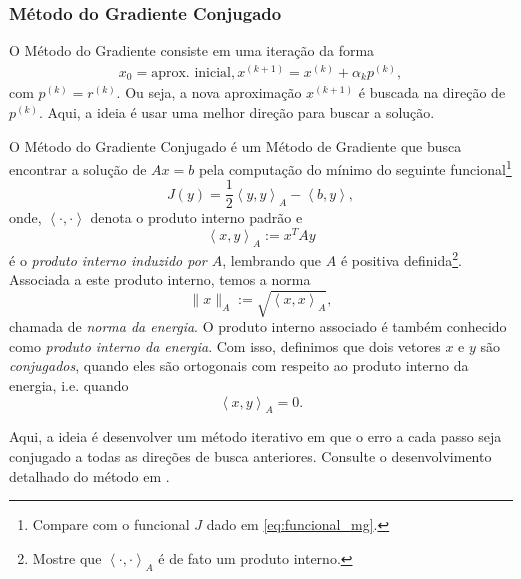\subsubsection{Método do Gradiente Conjugado}

O Método do Gradiente consiste em uma iteração da forma
\begin{gather}
  x_0 = \text{aprox. inicial},
  x^{(k+1)} = x^{(k)} + \alpha_kp^{(k)},
\end{gather}
com $p^{(k)} = r^{(k)}$. Ou seja, a nova aproximação $x^{(k+1)}$ é buscada na direção de $p^{(k)}$. Aqui, a ideia é usar uma melhor direção para buscar a solução.


O Método do Gradiente Conjugado é um Método de Gradiente que busca encontrar a solução de $Ax = b$ pela computação do mínimo do seguinte funcional\footnote{Compare com o funcional $J$ dado em \eqref{eq:funcional_mg}.}
\begin{equation}
  J(y) = \frac{1}{2}\left<y,y\right>_A - \left<b,y\right>, 
\end{equation}
onde, $\left<\cdot,\cdot\right>$ denota o produto interno padrão e
\begin{equation}
  \left<x,y\right>_A := x^TAy
\end{equation}
é o \emph{produto interno induzido por $A$}, lembrando que $A$ é positiva definida\footnote{Mostre que $\left<\cdot,\cdot\right>_A$ é de fato um produto interno.}. Associada a este produto interno, temos a norma
\begin{equation}
  \|x\|_A := \sqrt{\left<x,x\right>_A},
\end{equation}
chamada de \emph{norma da energia}. O produto interno associado é também conhecido como \emph{produto interno da energia}. Com isso, definimos que dois vetores $x$ e $y$ são \emph{conjugados}, quando eles são ortogonais com respeito ao produto interno da energia, i.e. quando
\begin{equation}
  \left<x,y\right>_A = 0.
\end{equation}

Aqui, a ideia é desenvolver um método iterativo em que o erro a cada passo seja conjugado a todas as direções de busca anteriores. Consulte o desenvolvimento detalhado do método em \cite[Seção 7.7]{Watkins2002}.



